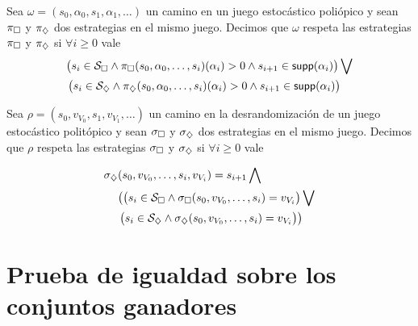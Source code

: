 Sea $\omega = (s_0, \alpha_0, s_1, \alpha_1, \dots)$ un camino en un juego
estocástico poliópico y sean $\pi_\square$ y $\pi_\diamondsuit$ dos estrategias en el mismo
juego. Decimos que $\omega$ respeta las estrategias $\pi_\square$ y $\pi_\diamondsuit$ si
$\forall i \geq 0$ vale
\begin{align*}
	&\bigl( s_i \in \mathcal{S}_\square \wedge \pi_\square(s_0, \alpha_0, \dots, s_i)(\alpha_i) > 0 \wedge s_{i+1} \in \textsf{supp}(\alpha_i) \bigr) \bigvee \\
	&\left(s_i \in \mathcal{S}_\diamondsuit \wedge \pi_\diamondsuit(s_0, \alpha_0, \dots, s_i)(\alpha_i) > 0 \wedge
	s_{i+1} \in \textsf{supp}(\alpha_i) \right)
\end{align*}

Sea $\rho = (s_0, v_{V_0}, s_1, v_{V_1}, \dots)$ un camino en la
desrandomización de un juego estocástico politópico y sean $\sigma_\square$ y
$\sigma_\diamondsuit$ dos estrategias en el mismo juego. Decimos que $\rho$ respeta
las estrategias $\sigma_\square$ y $\sigma_\diamondsuit$ si $\forall i \geq 0$ vale

\begin{align*}
	\sigma_\diamondsuit&(s_0, v_{V_0}, \dots, s_i, v_{V_i})=s_{i+1} \bigwedge \\
	&\bigl( \left( s_i \in \mathcal{S}_\square \wedge \sigma_\square(s_0, v_{V_0}, \dots, s_i)=v_{V_i} \right) \bigvee \\
	&\left( s_i \in \mathcal{S}_\diamondsuit \wedge \sigma_\diamondsuit(s_0, v_{V_0}, \dots, s_i)=v_{V_i} \right) \bigr)
\end{align*}

\section{Prueba de igualdad sobre los conjuntos ganadores}

